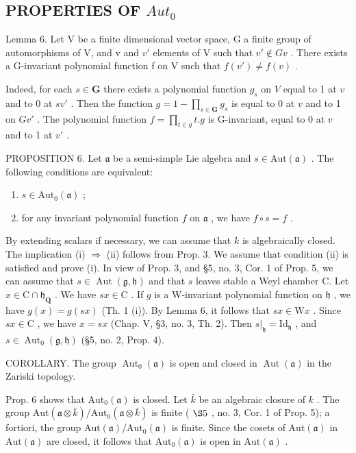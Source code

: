 \subsection{\texorpdfstring{PROPERTIES OF \(Aut_{0}\)}{PROPERTIES OF Aut\_\{0\}}}

Lemma 6. Let V be a finite dimensional vector space, G a finite group of automorphisms of V, and v and \(v'\) elements of V such that \(v' \notin Gv\) . There exists a G-invariant polynomial function f on V such that \(f(v') \neq f(v)\) .

Indeed, for each \(s \in \mathbf{G}\) there exists a polynomial function \(g_{s}\) on \(V\) equal to 1 at \(v\) and to 0 at \(sv'\) . Then the function \(g = 1 - \prod_{s \in \mathbf{G}} g_{s}\) is equal to 0 at \(v\) and to 1 on \(Gv'\) . The polynomial function \(f = \prod_{t \in g} t.g\) is G-invariant, equal to 0 at \(v\) and to 1 at \(v'\) .

PROPOSITION 6. Let \(\mathfrak{a}\) be a semi-simple Lie algebra and \(s\in \mathrm{Aut}(\mathfrak{a})\) . The following conditions are equivalent:

\begin{enumerate}
\def\labelenumi{(\roman{enumi})}
\item
  \(s \in \text{Aut}_{0}(\mathfrak{a})\) ;
\item
  for any invariant polynomial function \(f\) on \(\mathfrak{a}\) , we have \(f \circ s = f\) .
\end{enumerate}

By extending scalars if necessary, we can assume that \(k\) is algebraically closed. The implication (i) \(\Longrightarrow\) (ii) follows from Prop. 3. We assume that condition (ii) is satisfied and prove (i). In view of Prop. 3, and §5, no. 3, Cor. 1 of Prop. 5, we can assume that \(s \in \operatorname{Aut}(\mathfrak{g}, \mathfrak{h})\) and that \(s\) leaves stable a Weyl chamber C. Let \(x \in \mathrm{C} \cap \mathfrak{h}_{\mathbf{Q}}\) . We have \(sx \in \mathrm{C}\) . If \(g\) is a W-invariant polynomial function on \(\mathfrak{h}\) , we have \(g(x) = g(sx)\) (Th. 1 (i)). By Lemma 6, it follows that \(sx \in \mathrm{W}x\) . Since \(sx \in \mathrm{C}\) , we have \(x = sx\) (Chap. V, §3, no. 3, Th. 2). Then \(s|_{\mathfrak{h}} = \mathrm{Id}_{\mathfrak{h}}\) , and \(s \in \operatorname{Aut}_0(\mathfrak{g}, \mathfrak{h})\) (§5, no. 2, Prop. 4).

COROLLARY. The group \(\operatorname{Aut}_{0}(\mathfrak{a})\) is open and closed in \(\operatorname{Aut}(\mathfrak{a})\) in the Zariski topology.

Prop. 6 shows that \(\mathrm{Aut}_0(\mathfrak{a})\) is closed. Let \(\bar{k}\) be an algebraic closure of \(k\) . The group \(\mathrm{Aut}(\mathfrak{a} \otimes \bar{k}) / \mathrm{Aut}_0(\mathfrak{a} \otimes \bar{k})\) is finite ( \(\S 5\) , no. 3, Cor. 1 of Prop. 5); a fortiori, the group \(\mathrm{Aut}(\mathfrak{a}) / \mathrm{Aut}_0(\mathfrak{a})\) is finite. Since the cosets of \(\mathrm{Aut}(\mathfrak{a})\) in \(\mathrm{Aut}(\mathfrak{a})\) are closed, it follows that \(\mathrm{Aut}_0(\mathfrak{a})\) is open in \(\mathrm{Aut}(\mathfrak{a})\) .
\relax{}
